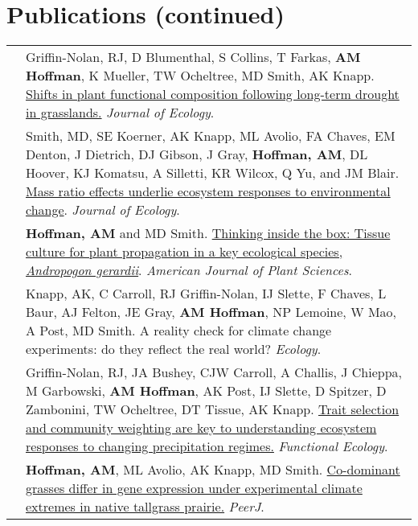 \documentclass[letterpaper]{deedy-resume} %
\begin{document}
\section{Publications (continued)}
\begin{tabular}{>{\raggedleft\arraybackslash}p{2cm}p{16cm}}

2019 & Griffin-Nolan, RJ, D Blumenthal, S Collins, T Farkas, \textbf{AM Hoffman}, K Mueller, TW Ocheltree, MD Smith, AK Knapp. \href{https://besjournals.onlinelibrary.wiley.com/doi/full/10.1111/1365-2745.13252}{Shifts in plant functional composition following long-term drought in grasslands.} \textcolor{special}{\textit{Journal of Ecology}}.\\

2019 & Smith, MD, SE Koerner, AK Knapp, ML Avolio, FA Chaves, EM Denton, J Dietrich, DJ Gibson, J Gray, \textbf{Hoffman, AM}, DL Hoover, KJ Komatsu, A Silletti, KR Wilcox, Q Yu, and JM Blair. \href{https://besjournals.onlinelibrary.wiley.com/doi/abs/10.1111/1365-2745.13330}{Mass ratio effects underlie ecosystem responses to environmental change}. \textcolor{special}{\textit{Journal of Ecology}}.\\

2018 & \textbf{Hoffman, AM} and MD Smith. \href{https://www.scirp.org/Journal/PaperInformation.aspx?PaperID=87129}{Thinking inside the box: Tissue culture for plant propagation in a key ecological species, \textit{Andropogon gerardii}}. \textcolor{special}{\textit{American Journal of Plant Sciences}}.\\	

2018 & Knapp, AK, C Carroll, RJ Griffin-Nolan, IJ Slette, F Chaves, L Baur, AJ Felton, JE Gray, \textbf{AM Hoffman}, NP Lemoine, W Mao, A Post, MD Smith. A reality check for climate change experiments: do they reflect the real world? \textcolor{special}{\textit{Ecology}}. \\

2018 & Griffin-Nolan, RJ, JA Bushey, CJW Carroll, A Challis, J Chieppa, M Garbowski, \textbf{AM Hoffman}, AK Post, IJ Slette, D Spitzer, D Zambonini, TW Ocheltree, DT Tissue, AK Knapp. \href{https://besjournals.onlinelibrary.wiley.com/doi/abs/10.1111/1365-2435.13135}{Trait selection and community weighting are key to understanding ecosystem responses to changing precipitation regimes.} \textcolor{special}{\textit{Functional Ecology}}.\\

2018 & \textbf{Hoffman, AM}, ML Avolio, AK Knapp, MD Smith. \href{https://peerj.com/articles/4394.pdf}{Co-dominant grasses differ in gene expression under experimental climate extremes in native tallgrass prairie.} \textcolor{special}{\textit{PeerJ}}.\\


\end{tabular}
\end{document}
